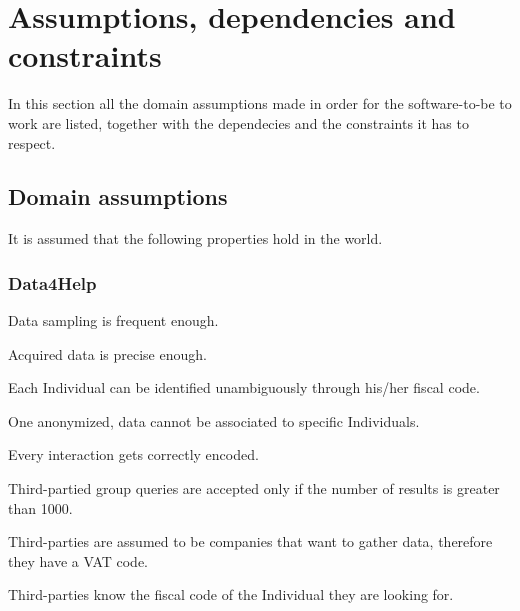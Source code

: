 \section{Assumptions, dependencies and constraints}
    In this section all the domain assumptions made in order for the software-to-be to work are listed, together with the dependecies and the constraints it has to respect.
    
    \subsection{Domain assumptions}
        It is assumed that the following properties hold in the world.
        
        \subsubsection{Data4Help}
        \begin{enumerate}[label={[}D1.\arabic*{]}]
            \item Data sampling is frequent enough. %
            
            \item Acquired data is precise enough.
            
            \item Each Individual can be identified unambiguously through his/her fiscal code.
            
            \item One anonymized, data cannot be associated to specific Individuals.
            
            \item Every interaction gets correctly encoded.
            
            \item Third-partied group queries are accepted only if the number of results is greater than 1000.
            
            \item Third-parties are assumed to be companies that want to gather data, therefore they have a VAT code.
            
            \item Third-parties know the fiscal code of the Individual they are looking for.
        \end{enumerate}
        
